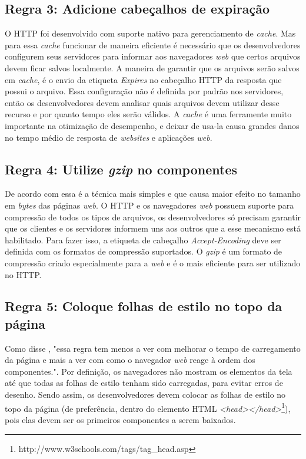 \subsection{Regra 3: Adicione cabeçalhos de expiração}
\label{subsec:highperformance_regra3}
O HTTP foi desenvolvido com suporte nativo para gerenciamento de \textit{cache}. Mas para essa \textit{cache} funcionar de maneira eficiente é necessário que os desenvolvedores configurem seus servidores para informar aos navegadores \textit{web} que certos arquivos devem ficar salvos localmente. A maneira de garantir que os arquivos serão salvos em \textit{cache}, é o envio da etiqueta \textit{Expires} no cabeçalho HTTP da resposta que possui o arquivo. Essa configuração não é definida por padrão nos servidores, então os desenvolvedores devem analisar quais arquivos devem utilizar desse recurso e por quanto tempo eles serão válidos. A \textit{cache} é uma ferramente muito importante na otimização de desempenho, e deixar de usa-la causa grandes danos no tempo médio de resposta de \textit{websites} e aplicações \textit{web}.

\subsection{Regra 4: Utilize \textit{gzip} no componentes}
\label{subsec:highperformance_regra4}
De acordo com  essa é a técnica mais simples e que causa maior efeito no tamanho em \textit{bytes} das páginas \textit{web}. O HTTP e os navegadores \textit{web} possuem suporte para compressão de todos os tipos de arquivos, os desenvolvedores só precisam garantir que os clientes e os servidores informem uns aos outros que a esse mecanismo está habilitado. Para fazer isso, a etiqueta de cabeçalho \textit{Accept-Encoding} deve ser definida com os formatos de compressão suportados. O \textit{gzip} é um formato de compressão criado especialmente para a \textit{web} e é o mais eficiente para ser utilizado no HTTP.

\subsection{Regra 5: Coloque folhas de estilo no topo da página}
\label{subsec:highperformance_regra5}
Como disse , "essa regra tem menos a ver com melhorar o tempo de carregamento da página e mais a ver com como o navegador \textit{web} reage à ordem dos componentes.". Por definição, os navegadores não mostram os elementos da tela até que todas as folhas de estilo tenham sido carregadas, para evitar erros de desenho. Sendo assim, os desenvolvedores devem colocar as folhas de estilo no topo da página (de preferência, dentro do elemento HTML \textit{<head></head>}\footnote{http://www.w3schools.com/tags/tag\_head.asp}), pois elas devem ser os primeiros componentes a serem baixados.

